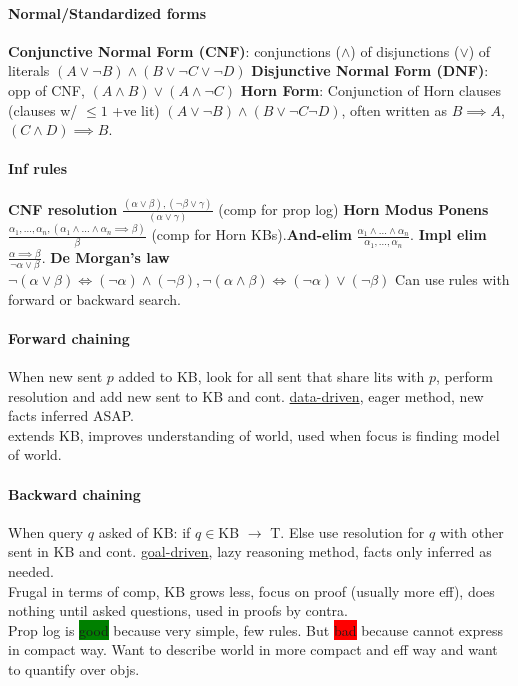 \paragraph{Normal/Standardized forms}
\textbf{Conjunctive Normal Form (CNF)}: conjunctions ($\land$) of
disjunctions ($\lor$)
of literals $(A \lor \neg B) \land (B \lor \neg C \lor \neg D)$
\textbf{Disjunctive Normal Form (DNF)}: opp of CNF, $(A \land B) \lor
(A \land \neg C)$
\textbf{Horn Form}: Conjunction of Horn clauses (clauses w/ $\leq 1$
+ve lit) $(A \lor \neg B)\land (B \lor \neg C \neg D)$, often written
as $B \implies A$, $(C \land D)\implies B$.
\paragraph{Inf rules} \textbf{CNF resolution} $\frac{(\alpha \lor
  \beta), (\neg \beta \lor \gamma)}{(\alpha \lor \gamma)}$ (comp for
prop log)
\textbf{Horn Modus Ponens} $\frac{\alpha_1, \ldots, \alpha_n,
  (\alpha_1 \land \ldots \land \alpha_n \implies
  \beta)}{\beta}$ (comp for Horn KBs).\textbf{And-elim} $\frac{\alpha_1 \land \ldots \land
  \alpha_n}{\alpha_1, \ldots ,\alpha_n}$. \textbf{Impl elim}
$\frac{\alpha \implies \beta}{\neg \alpha \lor \beta}$. \textbf{De
  Morgan's law} $\neg(\alpha \lor \beta)\iff (\neg \alpha)\land (\neg
\beta), \neg(\alpha \land \beta)\iff (\neg \alpha) \lor (\neg \beta)$
Can
use rules with forward or backward search. 
\paragraph{Forward chaining} When new sent $p$ added to KB, look for
all sent that share lits with $p$, perform resolution and add new sent
to KB and cont. \underline{data-driven}, eager method, new facts
inferred ASAP.
\\ extends KB, improves understanding of world, used when focus is
finding model of world.
\paragraph{Backward chaining} When query $q$ asked of KB: if $q\in$KB
$\to$ T. Else use resolution for $q$ with other sent in KB and
cont. \underline{goal-driven}, lazy reasoning method, facts only
inferred as needed.
\\ Frugal in terms of comp, KB grows less, focus on proof (usually
more eff), does nothing until asked questions, used in proofs by
contra.
\\ Prop log is \colorbox{green}{good} because very simple, few
rules. But \colorbox{red}{bad} because cannot express in compact
way. Want to describe world in more compact and eff way and want to
quantify over objs.
